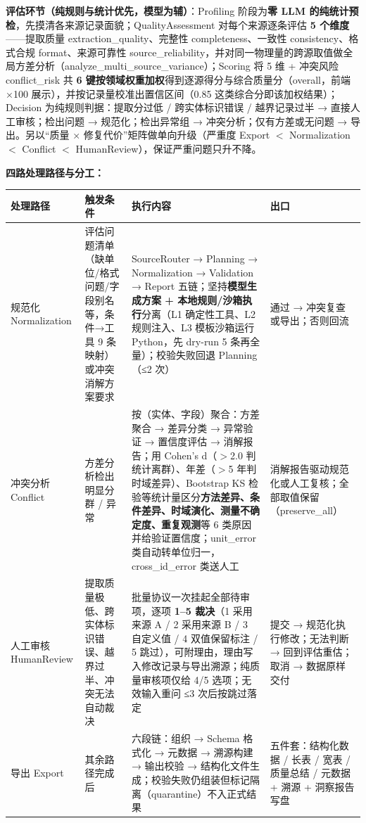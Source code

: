 \bigskip
\noindent\textbf{评估环节（纯规则与统计优先，模型为辅）}：Profiling 阶段为\textbf{零 LLM 的纯统计预检}，先摸清各来源记录面貌；QualityAssessment 对每个来源逐条评估 \textbf{5 个维度}——提取质量 extraction\_quality、完整性 completeness、一致性 consistency、格式合规 format、来源可靠性 source\_reliability，并对同一物理量的跨源取值做全局方差分析（analyze\_multi\_source\_variance）；Scoring 将 5 维 + 冲突风险 conflict\_risk 共 \textbf{6 键按领域权重加权}得到逐源得分与综合质量分（overall，前端 ×100 展示），并按记录量校准出置信区间（0.85 这类综合分即该加权结果）；Decision 为纯规则判据：提取分过低 / 跨实体标识错误 / 越界记录过半 → 直接人工审核；检出问题 → 规范化；检出异常组 → 冲突分析；仅有方差或无问题 → 导出。另以“质量 × 修复代价”矩阵做单向升级（严重度 Export $<$ Normalization $<$ Conflict $<$ HumanReview），保证严重问题只升不降。

\bigskip
\noindent\textbf{四路处理路径与分工：}

\begin{longtable}{@{}p{2.5cm}p{3.4cm}p{5.8cm}p{2.6cm}@{}}
\toprule
处理路径 & 触发条件 & 执行内容 & 出口 \\
\midrule
规范化 Normalization & 评估问题清单（缺单位/格式问题/字段别名等，条件→工具 9 条映射）或冲突消解方案要求 & SourceRouter → Planning → Normalization → Validation → Report 五链；坚持\textbf{模型生成方案 + 本地规则/沙箱执行}分离（L1 确定性工具、L2 规则注入、L3 模板沙箱运行 Python，先 dry-run 5 条再全量）；校验失败回退 Planning（≤2 次） & 通过 → 冲突复查或导出；否则回流 \\
冲突分析 Conflict & 方差分析检出明显分群 / 异常 & 按（实体、字段）聚合：方差聚合 → 差异分类 → 异常验证 → 置信度评估 → 消解报告；用 Cohen's d（$>$2.0 判统计离群）、年差（$>$5 年判时域差异）、Bootstrap KS 检验等统计量区分\textbf{方法差异、条件差异、时域演化、测量不确定度、重复观测}等 6 类原因并给验证置信度；unit\_error 类自动转单位归一，cross\_id\_error 类送人工 & 消解报告驱动规范化或人工复核；全部取值保留（preserve\_all） \\
人工审核 HumanReview & 提取质量极低、跨实体标识错误、越界过半、冲突无法自动裁决 & 批量协议一次挂起全部待审项，逐项 \textbf{1--5 裁决}（1 采用来源 A / 2 采用来源 B / 3 自定义值 / 4 双值保留标注 / 5 跳过），可附理由，理由写入修改记录与导出溯源；纯质量审核项仅给 4/5 选项；无效输入重问 ≤3 次后按跳过落定 & 提交 → 规范化执行修改；无法判断 → 回到评估重估；取消 → 数据原样交付 \\
导出 Export & 其余路径完成后 & 六段链：组织 → Schema 格式化 → 元数据 → 溯源构建 → 输出校验 → 结构化文件生成；校验失败仍组装但标记隔离（quarantine）不入正式结果 & 五件套：结构化数据 / 长表 / 宽表 / 质量总结 / 元数据 + 溯源 + 洞察报告写盘 \\
\bottomrule
\end{longtable}

